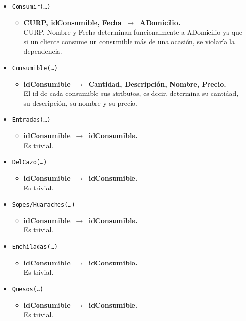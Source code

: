 \documentclass{article}
\newcommand{\flecha}{$\,\to\,$ }
\begin{document}
\begin{itemize}
\item \texttt{Consumir(\ldots)}
	\begin{itemize}
		\item \textbf{CURP, idConsumible, Fecha \flecha ADomicilio.}\\
		CURP, Nombre y Fecha determinan funcionalmente a ADomicilio ya que si un cliente consume un consumible más de una ocasión, se violaría la dependencia.
	\end{itemize}

\item \texttt{Consumible(\ldots)}
	\begin{itemize}
		\item \textbf{idConsumible \flecha Cantidad, Descripción, Nombre, Precio.}\\
		El id de cada consumible sus atributos, es decir, determina su cantidad, su descripción, su nombre y su precio.
	\end{itemize}

\item \texttt{Entradas(\ldots)}
	\begin{itemize}
		\item \textbf{idConsumible \flecha idConsumible.}\\
		Es trivial.
	\end{itemize}

\item \texttt{DelCazo(\ldots)}
	\begin{itemize}
		\item \textbf{idConsumible \flecha idConsumible.}\\
		Es trivial.
	\end{itemize}

\item \texttt{Sopes/Huaraches(\ldots)}
	\begin{itemize}
		\item \textbf{idConsumible \flecha idConsumible.}\\
		Es trivial.
	\end{itemize}

\item \texttt{Enchiladas(\ldots)}
	\begin{itemize}
		\item \textbf{idConsumible \flecha idConsumible.}\\
		Es trivial.
	\end{itemize}

\item \texttt{Quesos(\ldots)}
	\begin{itemize}
		\item \textbf{idConsumible \flecha idConsumible.}\\
		Es trivial.
	\end{itemize}


\end{itemize}
\end{document}
